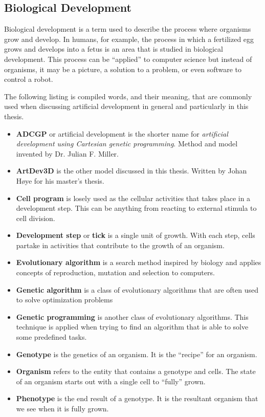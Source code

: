 \subsection{Biological Development}
Biological development is a term used to describe the process where organisms grow and develop. In humans, for example, the process in which a fertilized egg grows and develops into a fetus is an area that is studied in biological development. This process can be ``applied'' to computer science but instead of organisms, it may be a picture, a solution to a problem, or even software to control a robot.

The following listing is compiled words, and their meaning, that are commonly used when discussing artificial development in general and particularly in this thesis.

\begin{itemize}
\itemsep=0pt
	\item\textbf{ADCGP} or artificial development is the shorter name for \emph{artificial development using Cartesian genetic programming}. Method and model invented by Dr. Julian F. Miller.
	\item\textbf{ArtDev3D} is the other model discussed in this thesis. Written by Johan H{\o}ye for his master's thesis.
	\item\textbf{Cell program} is losely used as the cellular activities that takes place in a development step. This can be anything from reacting to external stimula to cell division.
	\item\textbf{Development step} or \textbf{tick} is a single unit of growth. With each step, cells partake in activities that contribute to the growth of an organism.
	\item\textbf{Evolutionary algorithm} is a search method inspired by biology and applies concepts of reproduction, mutation and selection to computers.
	\item\textbf{Genetic algorithm} is a class of evolutionary algorithms that are often used to solve optimization problems
	\item\textbf{Genetic programming} is another class of evolutionary algorithms. This technique is applied when trying to find an algorithm that is able to solve some predefined tasks.
	\item\textbf{Genotype} is the genetics of an organism. It is the ``recipe'' for an organism.
	\item\textbf{Organism} refers to the entity that contains a genotype and cells. The state of an organism starts out with a single cell to ``fully'' grown.
	\item\textbf{Phenotype} is the end result of a genotype. It is the resultant organism that we see when it is fully grown.
\end{itemize}

